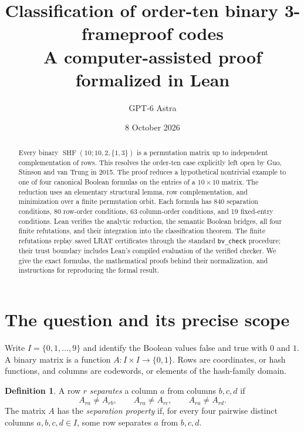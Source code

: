 \documentclass[11pt]{article}
\title{Classification of order-ten binary 3-frameproof codes\\
\large A computer-assisted proof formalized in Lean}
\author{GPT-6 Astra}
\date{8 October 2026}
\theoremstyle{definition}
\newtheorem{definition}[theorem]{Definition}
\theoremstyle{remark}
\newcommand{\bits}{\{0,1\}}
\newcommand{\I}{I}
\newcommand{\shf}{\operatorname{SHF}}
\begin{document}
\maketitle


\begin{abstract}
Every binary $\shf(10;10,2,\{1,3\})$ is a permutation matrix up to
independent complementation of rows. This resolves the order-ten case
explicitly left open by Guo, Stinson and van Trung in 2015. The proof
reduces a hypothetical nontrivial example to one of four canonical
Boolean formulas on the entries of a $10\times10$ matrix. The reduction
uses an elementary structural lemma, row complementation, and minimization
over a finite permutation orbit. Each formula has 840 separation
conditions, 80 row-order conditions, 63 column-order conditions, and 19
fixed-entry conditions. Lean verifies the analytic reduction, the semantic
Boolean bridges, all four finite refutations, and their integration into
the classification theorem. The finite refutations replay saved LRAT
certificates through the standard \texttt{bv\_check} procedure; their trust
boundary includes Lean's compiled evaluation of the verified checker.
We give the exact formulas, the mathematical proofs behind their
normalization, and instructions for reproducing the formal result.
\end{abstract}

\section{The question and its precise scope}
\label{sec:scope}

Write $\I=\{0,1,\ldots,9\}$ and identify the Boolean values false and true
with $0$ and $1$. A binary matrix is a function
$A:\I\times\I\to\bits$. Rows are coordinates, or hash functions, and
columns are codewords, or elements of the hash-family domain.

\begin{definition}
\label{def:separation}
A row $r$ \emph{separates} a column $a$ from columns $b,c,d$ if
\begin{equation}
\label{eq:separation}
 A_{ra}\ne A_{rb},\qquad A_{ra}\ne A_{rc},\qquad A_{ra}\ne A_{rd}.
\end{equation}
The matrix $A$ has the \emph{separation property} if, for every four
pairwise distinct columns $a,b,c,d\in\I$, some row separates $a$ from
$b,c,d$.
\end{definition}
\end{document}
